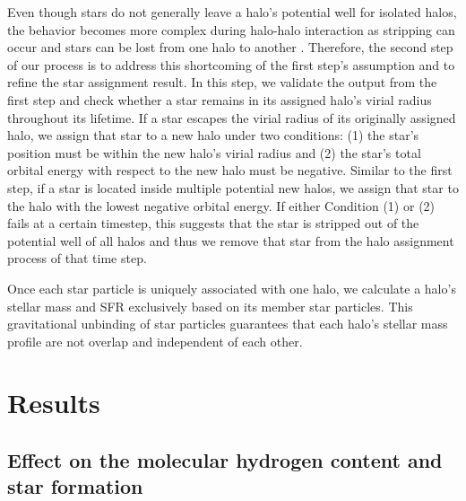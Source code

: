 \documentclass[linenumbers, twocolumn]{aastex631}
\begin{document}
Even though stars do not generally leave a halo's potential well for isolated halos, the behavior becomes more complex during halo-halo interaction as stripping can occur and stars can be lost from one halo to another \citep{Kannan+2015}. Therefore, the second step of our process is to address this shortcoming of the first step's assumption and to refine the star assignment result. In this step, we validate the output from the first step and check whether a star remains in its assigned halo's virial radius throughout its lifetime. If a star escapes the virial radius of its originally assigned halo, we assign that star to a new halo under two conditions: (1) the star's position must be within the new halo's virial radius and (2) the star's total orbital energy with respect to the new halo must be negative. Similar to the first step, if a star is located inside multiple potential new halos, we assign that star to the halo with the lowest negative orbital energy. If either Condition (1) or (2) fails at a certain timestep, this suggests that the star is stripped out of the potential well of all halos and thus we remove that star from the halo assignment process of that time step. 

Once each star particle is uniquely associated with one halo, we calculate a halo's stellar mass and SFR exclusively based on its member star particles. This gravitational unbinding of star particles guarantees that each halo's stellar mass profile are not overlap and independent of each other. 
 
\section{Results}

\subsection{Effect on the molecular hydrogen content and star formation}
\label{subsect:effect_on_sf}
\end{document}
